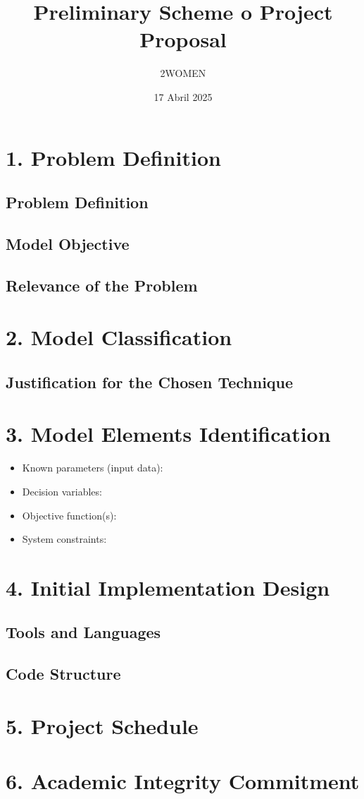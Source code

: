 \documentclass[12pt]{article}
\title{Preliminary Scheme o Project Proposal}
\author{2WOMEN}
\date{17 Abril 2025}
\begin{document}
\maketitle

\section*{1. Problem Definition}



\subsection*{Problem Definition}

\subsection*{Model Objective}

\subsection*{Relevance of the Problem}



\section*{2. Model Classification}

\subsection*{Justification for the Chosen Technique}


\section*{3. Model Elements Identification}

\begin{itemize}
    \item Known parameters (input data):
    \item Decision variables:
    \item Objective function(s):
    \item System constraints:
\end{itemize}

\section*{4. Initial Implementation Design}

\subsection*{Tools and Languages}

\subsection*{Code Structure}



\section*{5. Project Schedule}


\section*{6. Academic Integrity Commitment}
\end{document}
